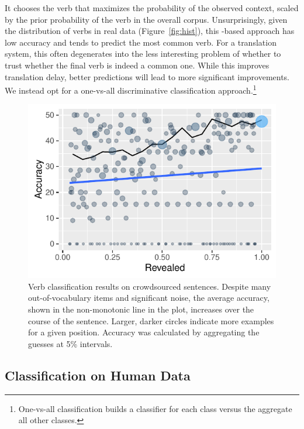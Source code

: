 It chooses the verb that maximizes the probability of the observed
context, scaled by the prior probability of the verb in the overall
corpus. Unsurprisingly, given the distribution of verbs in real data
(Figure~\ref{fig:hist}), this \ngram{}-based approach has low accuracy
and tends to predict the most common verb. For a translation system,
this often degenerates into the less interesting problem of whether to
trust whether the final verb is indeed a common one.  While this
improves translation delay, better predictions will lead to more
significant improvements.  We instead opt for a one-vs-all
discriminative classification approach.\footnote{One-vs-all
  classification builds a classifier for each class versus the
  aggregate all other classes.} 
\begin{figure}[t!]
  \begin{center} \includegraphics[width=1.0\linewidth]{2016_conll_verbpred/figures/CF_classify} \caption{Verb
      classification results on crowdsourced sentences. Despite many
      out-of-vocabulary items and significant noise, the average
      accuracy, shown in the non-monotonic line in the plot, increases
      over the course of the sentence. Larger, darker circles indicate
      more examples for a given position.  Accuracy was calculated by
      aggregating the guesses at 5\% intervals. }
\label{fig:CF_classify}
\end{center}
\end{figure}

\subsection{Classification on Human Data}
\label{sec:cf_classify}

